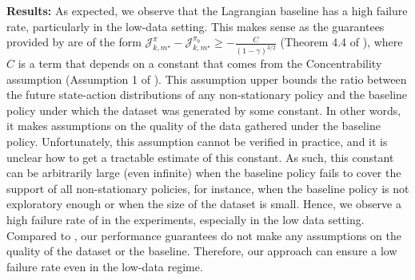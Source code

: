 
\textbf{Results:} As expected, we observe that the Lagrangian baseline has a high failure rate, particularly in the low-data setting. 
This makes sense as the guarantees provided by \cite{le2019batch} are of the form $\mathcal{J}^\pi_{k,m^{\star}} - \mathcal{J}^{\pi_{b}}_{k, m^{\star}} \geq - \frac{C}{(1-\gamma)^{3/2}}$ (Theorem 4.4 of \cite{le2019batch}), where $C$ is a term that depends on a constant that comes from the Concentrability assumption (Assumption 1 of \cite{le2019batch}). This assumption upper bounds the ratio between the future state-action distributions of any non-stationary policy and the baseline policy under which the dataset was generated by some constant. In other words, it makes assumptions on the quality of the data gathered under the baseline policy. Unfortunately, this assumption cannot be verified in practice, and it is unclear how to get a tractable estimate of this constant. As such, this constant can be arbitrarily large (even infinite) when the baseline policy fails to cover the support of all non-stationary policies, for instance, when the baseline policy is not exploratory enough or when the size of the dataset is small. Hence, we observe a high failure rate of \cite{le2019batch} in the experiments, especially in the low data setting. Compared to \cite{le2019batch}, our performance guarantees do not make any assumptions on the quality of the dataset or the baseline. Therefore, our approach can ensure a low failure rate even in the low-data regime.




